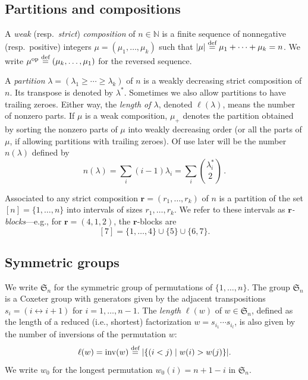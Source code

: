 \documentclass[12pt]{amsart}
\theoremstyle{definition}
\theoremstyle{remark}
\newcommand{\NN}{{\mathbb N}}
\newcommand{\rr}{{\mathbf r}}
\newcommand{\Sfrak}{{\mathfrak S}}
\DeclareMathOperator{\inv}{inv}
\DeclareMathOperator{\op}{op}
\newcommand{\defeq}{\mathrel{\overset{\text{{\rm def}}}{=}}}
\begin{document}
\subsection{Partitions and compositions}
\label{ss:partitions-etc}

A {\em weak} (resp.\ {\em strict}) {\em composition} of \(n \in \NN\)
is a finite sequence of nonnegative (resp.\ positive) integers \(\mu =
(\mu_1,\ldots,\mu_k)\) such that \(|\mu| \defeq \mu_1+\cdots+\mu_k =
n\).  We write $\mu ^{\op } \defeq (\mu _{k},\ldots,\mu _{1})$ for the
reversed sequence.

A {\em partition} $\lambda = (\lambda _{1}\geq \cdots\geq \lambda
_{k})$ of $n$ is a weakly decreasing strict composition of $n$.  Its
transpose is denoted by $\lambda ^{*}$.  Sometimes we also allow
partitions to have trailing zeroes.  Either way, the {\em length of
$\lambda $}, denoted $\ell (\lambda )$, means the number of nonzero
parts.  If \(\mu\) is a weak composition, $\mu _{+}$ denotes the
partition obtained by sorting the nonzero parts of $\mu $ into weakly
decreasing order (or all the parts of $\mu $, if allowing partitions
with trailing zeroes).  Of use later will be the number \(n(\lambda)\)
defined by
\begin{equation}\label{e:n(lambda)}
n(\lambda ) = \sum _{i}(i-1)\lambda _{i} = \sum _{i}\binom{\lambda
_{i}^{*}}{2} \,.
\end{equation}

Associated to any strict composition $\rr =(r_{1},\ldots,r_{k})$ of
$n$ is a partition of the set $[n] = \{1,\ldots,n \}$ into intervals
of sizes $r_{1},\ldots,r_{k}$.  We refer to these intervals as {\em
$\rr$-blocks}---e.g.,   for $\rr =(4,1,2)$, the $\rr$-blocks are
\begin{equation}\label{e:r-blocks}
[7]  = \{1,\ldots,4 \} \cup \{5 \} \cup \{6, 7 \}.
\end{equation}

\subsection{Symmetric groups}
\label{ss:Sn}

We write $\Sfrak _{n}$ for the symmetric group of permutations of
$\{1,\ldots,n \}$.  The group $\Sfrak _{n}$ is a Coxeter group with
generators given by the adjacent transpositions $s_{i} = (i
\leftrightarrow i+1)$ for $i=1,\ldots,n-1$.  The {\em length} $\ell
(w)$ of $w\in \Sfrak _{n}$, defined as the length of a reduced (i.e.,
shortest) factorization $w = s_{i_{1}}\cdots s_{i_{l}}$, is also given
by the number of inversions of the permutation $w$:
\begin{equation}\label{e:length=inv}
\ell (w) = \inv (w) \defeq |\{(i<j)\mid w(i)>w(j) \}|.
\end{equation}
We write $w_0$ for the longest permutation $w_0(i) = n+1-i$ in
$\Sfrak_n$.
\end{document}
